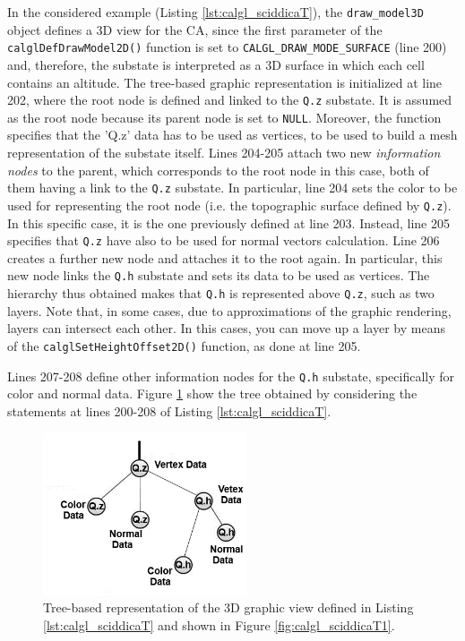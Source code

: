 In the considered example (Listing \ref{lst:calgl_sciddicaT}), the
\verb'draw_model3D' object defines a 3D view for the CA, since the
first parameter of the \verb'calglDefDrawModel2D()' function is set to
\verb'CALGL_DRAW_MODE_SURFACE' (line 200) and, therefore, the substate
is interpreted as a 3D surface in which each cell contains an
altitude. The tree-based graphic representation is initialized at line
202, where the root node is defined and linked to the \verb'Q.z'
substate. It is assumed as the root node because its parent node is
set to \verb'NULL'. Moreover, the function specifies that the 'Q.z'
data has to be used as vertices, to be used to build a mesh
representation of the substate itself. Lines 204-205 attach two new
\emph{information nodes} to the parent, which corresponds to the root
node in this case, both of them having a link to the \verb'Q.z'
substate. In particular, line 204 sets the color to be used for
representing the root node (i.e. the topographic surface defined by
\verb'Q.z'). In this specific case, it is the one previously defined
at line 203. Instead, line 205 specifies that \verb'Q.z' have also to
be used for normal vectors calculation. Line 206 creates a further new
node and attaches it to the root again. In particular, this new node
links the \verb'Q.h' substate and sets its data to be used as
vertices. The hierarchy thus obtained makes that \verb'Q.h' is
represented above \verb'Q.z', such as two layers. Note that, in some
cases, due to approximations of the graphic rendering, layers can
intersect each other. In this cases, you can move up a layer by means of
the \verb'calglSetHeightOffset2D()' function, as done at line 205.

Lines 207-208 define
other information nodes for the \verb'Q.h' substate, specifically for
color and normal data. Figure \ref{fig:opencal_gl_tree_example} show
the tree obtained by considering the statements at lines 200-208 of
Listing \ref{lst:calgl_sciddicaT}.

\begin{figure}
  \begin{center}
    \includegraphics[width=6cm]{./images/OpenCAL/calgl_sciddicaT_tree_model}
    \caption{Tree-based representation of the 3D graphic view defined
      in Listing \ref{lst:calgl_sciddicaT} and shown in Figure
      \ref{fig:calgl_sciddicaT1}.}
    \label{fig:opencal_gl_tree_example}
  \end{center}
\end{figure}

